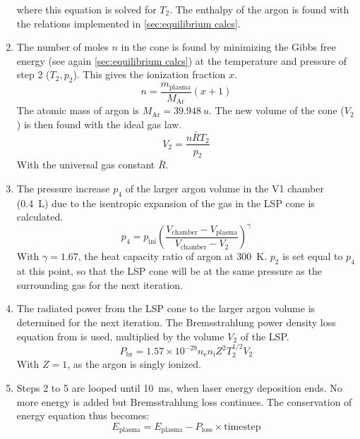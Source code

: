\begin{enumerate}
\begin{equation}
                \end{equation}
                where this equation is solved for $T_2$. The enthalpy of the argon is found with the relations implemented in \autoref{sec:equilibrium calcs}.
            \item The number of moles $n$ in the cone is found by minimizing the Gibbs free energy (see again \autoref{sec:equilibrium calcs}) at the temperature and pressure of step 2 ($T_2, p_2$). This gives the ionization fraction $x$.
                \begin{equation}
                    n = \frac{m_\mathrm{plasma}}{M_\mathrm{Ar}}(x + 1)
                \end{equation}
                The atomic mass of argon is $M_\mathrm{Ar} = \qty{39.948}{u}$. The new volume of the cone ($V_2$) is then found with the ideal gas law.
                \begin{equation}
                    V_2 = \frac{n \bar{R} T_2}{p_2}
                \end{equation}
                With the universal gas constant $\bar{R}$.
            \item The pressure increase $p_4$ of the larger argon volume in the V1 chamber (\qty{0.4}{L}) due to the isentropic expansion of the gas in the LSP cone is calculated.
                \begin{equation}
                    p_4 = p_\mathrm{ini} \left(\frac{V_\mathrm{chamber} - V_\mathrm{plasma}}{V_\mathrm{chamber} - V_2}\right)^\gamma
                \end{equation}
                With $\gamma=1.67$, the heat capacity ratio of argon at \qty{300}{K}. $p_2$ is set equal to $p_4$ at this point, so that the LSP cone will be at the same pressure as the surrounding gas for the next iteration.
            \item The radiated power from the LSP cone to the larger argon volume is determined for the next iteration. The Bremsstrahlung power density loss equation from \textcite{glasstoneControlledThermonuclearReactions1975} is used, multiplied by the volume $V_2$ of the LSP.
                \begin{equation}
                    P_\mathrm{br} = 1.57 \times 10^{-28} n_\mathrm{e} n_\mathrm{i} Z^2 T_2^{1/2} V_2
                \end{equation}
                With $Z = 1$, as the argon is singly ionized.
            \item Steps 2 to 5 are looped until \qty{10}{ms}, when laser energy deposition ends. No more energy is added but Bremsstrahlung loss continues. The conservation of energy equation thus becomes:
                \begin{equation}
                    E_\mathrm{plasma} = E_\mathrm{plasma} - P_\mathrm{loss} \times \mathrm{timestep}
                \end{equation}
        \end{enumerate}
        
